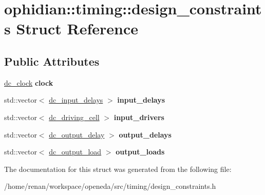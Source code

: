 \hypertarget{structophidian_1_1timing_1_1design__constraints}{\section{ophidian\-:\-:timing\-:\-:design\-\_\-constraints Struct Reference}
\label{structophidian_1_1timing_1_1design__constraints}
}
\subsection*{Public Attributes}
\begin{DoxyCompactItemize}
\item 
\hypertarget{structophidian_1_1timing_1_1design__constraints_a887bb719dde98d4635450445ca0cb7a3}{\hyperlink{structophidian_1_1timing_1_1dc__clock}{dc\-\_\-clock} {\bfseries clock}}\label{structophidian_1_1timing_1_1design__constraints_a887bb719dde98d4635450445ca0cb7a3}

\item 
\hypertarget{structophidian_1_1timing_1_1design__constraints_abdcd5469d71db560051307cad892264e}{std\-::vector$<$ \hyperlink{structophidian_1_1timing_1_1dc__input__delays}{dc\-\_\-input\-\_\-delays} $>$ {\bfseries input\-\_\-delays}}\label{structophidian_1_1timing_1_1design__constraints_abdcd5469d71db560051307cad892264e}

\item 
\hypertarget{structophidian_1_1timing_1_1design__constraints_af23b31c5745d07710d7e5e489012c674}{std\-::vector$<$ \hyperlink{structophidian_1_1timing_1_1dc__driving__cell}{dc\-\_\-driving\-\_\-cell} $>$ {\bfseries input\-\_\-drivers}}\label{structophidian_1_1timing_1_1design__constraints_af23b31c5745d07710d7e5e489012c674}

\item 
\hypertarget{structophidian_1_1timing_1_1design__constraints_a9acdb3718dc052dd259504b10d1e6722}{std\-::vector$<$ \hyperlink{structophidian_1_1timing_1_1dc__output__delay}{dc\-\_\-output\-\_\-delay} $>$ {\bfseries output\-\_\-delays}}\label{structophidian_1_1timing_1_1design__constraints_a9acdb3718dc052dd259504b10d1e6722}

\item 
\hypertarget{structophidian_1_1timing_1_1design__constraints_af0ed5233b52c421a8b863cd27b5d8528}{std\-::vector$<$ \hyperlink{structophidian_1_1timing_1_1dc__output__load}{dc\-\_\-output\-\_\-load} $>$ {\bfseries output\-\_\-loads}}\label{structophidian_1_1timing_1_1design__constraints_af0ed5233b52c421a8b863cd27b5d8528}

\end{DoxyCompactItemize}


The documentation for this struct was generated from the following file\-:\begin{DoxyCompactItemize}
\item 
/home/renan/workspace/openeda/src/timing/design\-\_\-constraints.\-h\end{DoxyCompactItemize}
